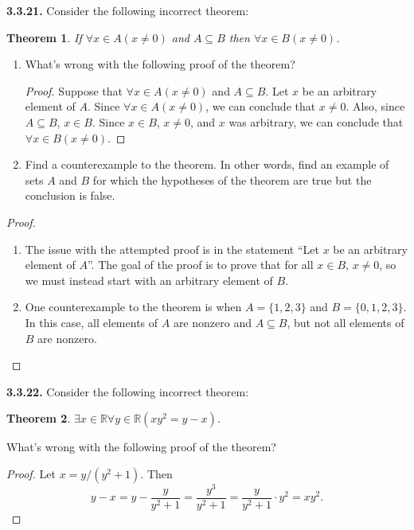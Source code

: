 \documentclass[12pt]{amsart}
\newenvironment{statement}[1]{\smallskip\noindent\color[rgb]{.6627, .3529, .6314} {\bf #1.}}{}
\newtheorem{theorem}{Theorem}
\theoremstyle{definition}
\theoremstyle{remark}
\newcommand{\BR}{\mathbb R}
\begin{document}
\begin{statement}{3.3.21}
Consider the following incorrect theorem:
\begin{theorem}
	If $\forall x \in A (x \neq 0)$ and $A \subseteq B$ then $\forall x \in B (x \neq 0)$.
\end{theorem}
\begin{enumerate}
	\item What's wrong with the following proof of the theorem?
	\begin{proof}
		Suppose that $\forall x \in A (x \neq 0)$ and $A \subseteq B$.
		Let $x$ be an arbitrary element of $A$.
		Since $\forall x \in A (x \neq 0)$, we can conclude that $x \neq 0$.
		Also, since $A \subseteq B$, $x \in B$.
		Since $x \in B$, $x \neq 0$, and $x$ was arbitrary, 
		we can conclude that $\forall x \in B (x \neq 0)$.
	\end{proof}
	
	\item Find a counterexample to the theorem.
	In other words, find an example of sets $A$ and $B$ for which the hypotheses of the theorem
	are true but the conclusion is false.
\end{enumerate}
\end{statement}

\begin{proof}
\hfill
\begin{enumerate}
	\item The issue with the attempted proof is in the statement
	``Let $x$ be an arbitrary element of $A$''.
	The goal of the proof is to prove that for all $x \in B$, $x \neq 0$,
	so we must instead start with an arbitrary element of $B$.
	
	\item One counterexample to the theorem is when $A = \{ 1, 2, 3 \}$ and $B = \{ 0, 1, 2, 3 \}$.
	In this case, all elements of $A$ are nonzero and $A \subseteq B$, 
	but not all elements of $B$ are nonzero.
\end{enumerate}
\end{proof}


\begin{statement}{3.3.22}
Consider the following incorrect theorem:
\begin{theorem}
	$\exists x \in \BR \forall y \in \BR (xy^2 = y - x)$.
\end{theorem}
What's wrong with the following proof of the theorem?
\begin{proof}
	Let $x = y / (y^2 + 1)$. Then
	\begin{equation*}
		y - x
		= y - \frac{y}{y^2 + 1}
		= \frac{y^3}{y^2 + 1}
		= \frac{y}{y^2 + 1} \cdot y^2
		= xy^2.
	\end{equation*}
\end{proof}
\end{statement}
\end{document}
